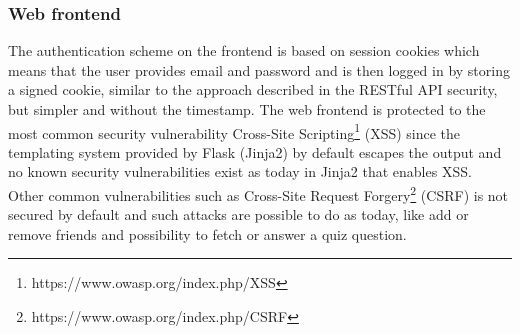 \subsubsection{Web frontend}
The authentication scheme on the frontend is based on session cookies which means that the user provides email and password and is then logged in by storing a signed cookie, similar to the approach described in the RESTful API security, but simpler and without the timestamp. The web frontend is protected to the most common security vulnerability Cross-Site Scripting\footnote{https://www.owasp.org/index.php/XSS} (XSS) since the templating system provided by Flask (Jinja2) by default escapes the output and no known security vulnerabilities exist as today in Jinja2 that enables XSS. Other common vulnerabilities such as Cross-Site Request Forgery\footnote{https://www.owasp.org/index.php/CSRF} (CSRF) is not secured by default and such attacks are possible to do as today, like add or remove friends and possibility to fetch or answer a quiz question.
